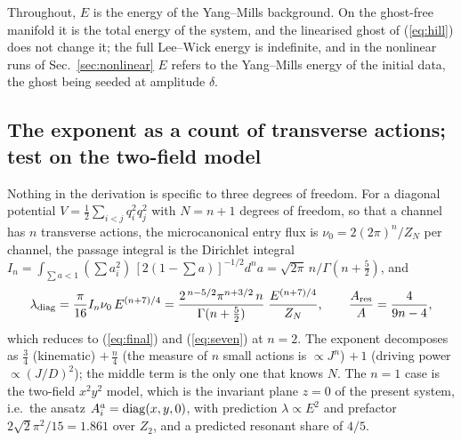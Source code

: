 Throughout, $E$ is the energy of the Yang--Mills background. On the ghost-free manifold it is
the total energy of the system, and the linearised ghost of (\ref{eq:hill}) does not change it;
the full Lee--Wick energy is indefinite, and in the nonlinear runs of Sec.~\ref{sec:nonlinear}
$E$ refers to the Yang--Mills energy of the initial data, the ghost being seeded at amplitude
$\delta$.


\subsection{The exponent as a count of transverse actions; test on the two-field model}
\label{sec:twofield}

Nothing in the derivation is specific to three degrees of freedom. For a diagonal potential
$V=\tfrac12\sum_{i<j}q_i^2q_j^2$ with $N=n+1$ degrees of freedom, so that a channel has $n$
transverse actions, the microcanonical entry flux is $\nu_0=2(2\pi)^n/Z_N$ per channel, the
passage integral is the Dirichlet integral
$I_n=\int_{\sum a<1}(\sum a_i^2)\,[2(1-\sum a)]^{-1/2}d^na=\sqrt{2\pi}\,n/\Gamma(n+\tfrac52)$,
and
\begin{equation}
\lambda_{\rm diag}=\frac{\pi}{16}I_n\nu_0\,E^{(n+7)/4}
=\frac{2^{\,n-5/2}\pi^{n+3/2}\,n}{\Gamma(n+\frac52)}\;\frac{E^{(n+7)/4}}{Z_N},
\qquad \frac{A_{\rm res}}{A}=\frac{4}{9n-4},
\label{eq:general}
\end{equation}
which reduces to (\ref{eq:final}) and (\ref{eq:seven}) at $n=2$. The exponent decomposes as
$\tfrac34$ (kinematic) $+\,\tfrac n4$ (the measure of $n$ small actions is $\propto J^n$)
$+\,1$ (driving power $\propto(J/D)^2$); the middle term is the only one that knows $N$. The
$n=1$ case is the two-field $x^2y^2$ model, which is the invariant plane $z=0$ of the present
system, i.e.\ the ansatz $A^a_i={\rm diag}(x,y,0)$, with prediction $\lambda\propto E^2$ and
prefactor $2\sqrt2\pi^2/15=1.861$ over $Z_2$, and a predicted resonant share of $4/5$.

